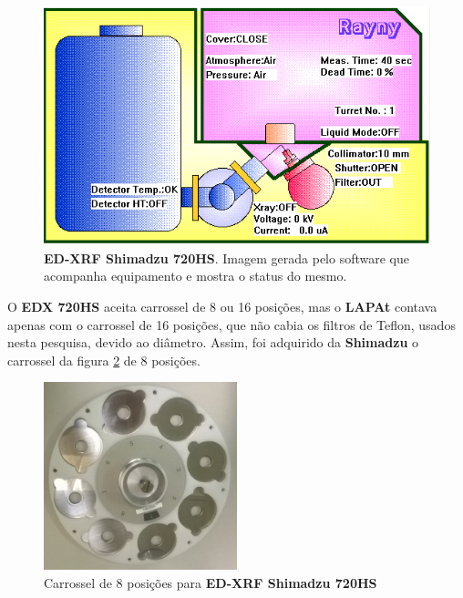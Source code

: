 \begin{figure}[H]
\begin{center}
  \includegraphics[scale=0.4]{../inputs/images/edx_iag_monitor.png}
  \caption{\textbf{ED-XRF Shimadzu 720HS}. Imagem gerada pelo software que 
           acompanha equipamento e mostra o status do mesmo. \label{fig:xrfed_software}}
\end{center}
\end{figure}

O \textbf{EDX 720HS} aceita carrossel de 8 ou 16 posições, mas o \textbf{LAPAt}
contava apenas com o carrossel de 16 posições, que não cabia os filtros de Teflon, 
usados nesta pesquisa, devido ao diâmetro. Assim, foi adquirido da \textbf{Shimadzu} 
o carrossel da figura \ref{fig:carrossel8} de 8 posições.

\begin{figure}[H]
\begin{center}
  \includegraphics[width=0.5\textwidth]{../inputs/images/carrossel8.jpg}
  \caption{Carrossel de 8 posições para \textbf{ED-XRF Shimadzu 720HS} \label{fig:carrossel8}}
\end{center}
\end{figure}

